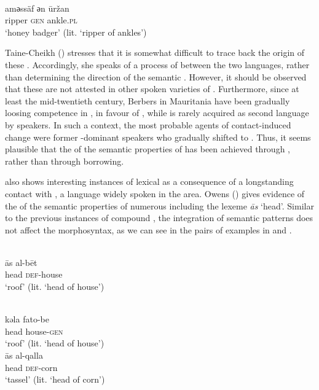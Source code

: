 \documentclass[output=paper]{langsci/langscibook}
\begin{document}
\\
\gll   amәssäf әn ūržan \\
       ripper \textsc{gen} ankle.\textsc{pl} \\
\glt   `honey badger' (lit. ‘ripper of ankles’)
\z
\z

Taine-Cheikh (\citeyear[126]{Taine-Cheikh2008chapter}) stresses that it is somewhat difficult to trace back the origin of these . Accordingly, she speaks of a process of  between the two languages, rather than determining the direction of the semantic . However, it should be observed that these  are not attested in other spoken varieties of . Furthermore, since at least the mid-twentieth century, Berbers in Mauritania have been gradually loosing competence in , in favour of  \citep[100]{Taine-Cheikh2012}, while  is rarely acquired as second language by   speakers. In such a context, the most probable agents of contact-induced change were former -dominant speakers who gradually shifted to . Thus, it seems plausible that the  of the semantic properties of   has been achieved through , rather than through borrowing.

  also shows interesting instances of lexical  as a consequence of a longstanding contact with , a  language widely spoken in the  area. Owens (\citeyear{Owens2015,Owens2016idioms}) gives evidence of the  of the semantic properties of numerous  including the lexeme \textit{{\R}ās} ‘head’. Similar to the previous instances of compound , the integration of  semantic patterns does not affect the  morphosyntax, as we can see in the  pairs of examples in  and . 

\ea\label{ex:roof}
\\
\gll   {\R}ās al-bēt \\
       head \textsc{def}-house\\
\glt   `roof' (lit. ‘head of house’)

\\
\gll   kǝla fato-be   \\
       head house-\textsc{gen}\\
\glt   `roof' (lit. ‘head of house’)
\z
\ex\label{ex:tassel}
\\
\gll   {\R}ās al-qalla  \\
       head \textsc{def}-corn\\
\glt   `tassel' (lit. ‘head of corn')
\end{document}
